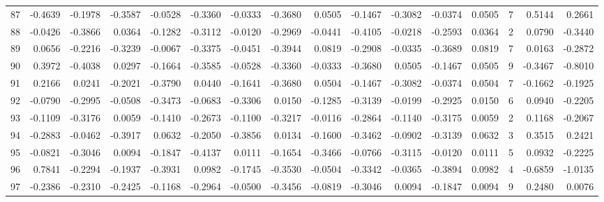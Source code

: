 \begin{tabular}{lrrrrrrrrrrrrrrr}
87  &     -0.4639 & -0.1978 & -0.3587 & -0.0528 & -0.3360 & -0.0333 & -0.3680 &  0.0505 & -0.1467 & -0.3082 &  -0.0374 &     0.0505 &      7 &                    0.5144 &                     0.2661 \\
88  &     -0.0426 & -0.3866 &  0.0364 & -0.1282 & -0.3112 & -0.0120 & -0.2969 & -0.0441 & -0.4105 & -0.0218 &  -0.2593 &     0.0364 &      2 &                    0.0790 &                    -0.3440 \\
89  &      0.0656 & -0.2216 & -0.3239 & -0.0067 & -0.3375 & -0.0451 & -0.3944 &  0.0819 & -0.2908 & -0.0335 &  -0.3689 &     0.0819 &      7 &                    0.0163 &                    -0.2872 \\
90  &      0.3972 & -0.4038 &  0.0297 & -0.1664 & -0.3585 & -0.0528 & -0.3360 & -0.0333 & -0.3680 &  0.0505 &  -0.1467 &     0.0505 &      9 &                   -0.3467 &                    -0.8010 \\
91  &      0.2166 &  0.0241 & -0.2021 & -0.3790 &  0.0440 & -0.1641 & -0.3680 &  0.0504 & -0.1467 & -0.3082 &  -0.0374 &     0.0504 &      7 &                   -0.1662 &                    -0.1925 \\
92  &     -0.0790 & -0.2995 & -0.0508 & -0.3473 & -0.0683 & -0.3306 &  0.0150 & -0.1285 & -0.3139 & -0.0199 &  -0.2925 &     0.0150 &      6 &                    0.0940 &                    -0.2205 \\
93  &     -0.1109 & -0.3176 &  0.0059 & -0.1410 & -0.2673 & -0.1100 & -0.3217 & -0.0116 & -0.2864 & -0.1140 &  -0.3175 &     0.0059 &      2 &                    0.1168 &                    -0.2067 \\
94  &     -0.2883 & -0.0462 & -0.3917 &  0.0632 & -0.2050 & -0.3856 &  0.0134 & -0.1600 & -0.3462 & -0.0902 &  -0.3139 &     0.0632 &      3 &                    0.3515 &                     0.2421 \\
95  &     -0.0821 & -0.3046 &  0.0094 & -0.1847 & -0.4137 &  0.0111 & -0.1654 & -0.3466 & -0.0766 & -0.3115 &  -0.0120 &     0.0111 &      5 &                    0.0932 &                    -0.2225 \\
96  &      0.7841 & -0.2294 & -0.1937 & -0.3931 &  0.0982 & -0.1745 & -0.3530 & -0.0504 & -0.3342 & -0.0365 &  -0.3894 &     0.0982 &      4 &                   -0.6859 &                    -1.0135 \\
97  &     -0.2386 & -0.2310 & -0.2425 & -0.1168 & -0.2964 & -0.0500 & -0.3456 & -0.0819 & -0.3046 &  0.0094 &  -0.1847 &     0.0094 &      9 &                    0.2480 &                     0.0076 \\

\end{tabular}
